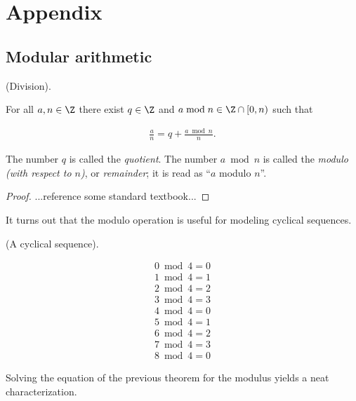\chapter{Appendix}

\section*{Modular arithmetic}

\begin{theorem}
    (Division).

    For all $a, n \in \Z$ there exist $q \in \Z$ and $a \bmod n \in \Z \cap [0, n)$ such that 
    
    \begin{align*}
    	\frac{a}{n} = q + \frac{a \bmod n}{n}.
    \end{align*}
    
    The number $q$ is called the \textit{quotient}. The number $a \bmod n$ is called the \textit{modulo (with respect to $n$)}, or \textit{remainder}; it is read as ``$a$ modulo $n$''.
\end{theorem}

\begin{proof}    
    ...reference some standard textbook...
\end{proof}

It turns out that the modulo operation is useful for modeling cyclical sequences.

\begin{example}
    (A cyclical sequence).

    \begin{align*}
        0 \bmod 4 = 0 \\
        1 \bmod 4 = 1 \\
        2 \bmod 4 = 2 \\
        3 \bmod 4 = 3 \\
        4 \bmod 4 = 0 \\
        5 \bmod 4 = 1 \\
        6 \bmod 4 = 2 \\
        7 \bmod 4 = 3 \\
        8 \bmod 4 = 0
    \end{align*}
\end{example} 

Solving the equation of the previous theorem for the modulus yields a neat characterization.

